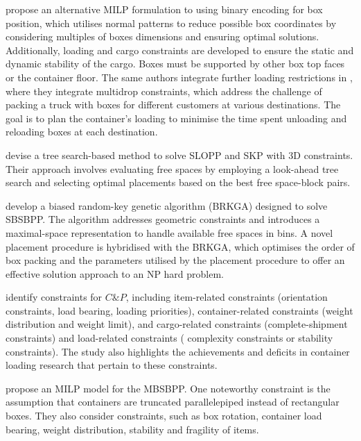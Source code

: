 \autocite{Junqueira2012Three-dimensionalConstraints} propose an alternative MILP formulation to \autocite{Chen1995EUROPEANProblem} using binary encoding for box position, which utilises normal patterns to reduce possible box coordinates by considering multiples of boxes dimensions and ensuring optimal solutions. Additionally, loading and cargo constraints are developed to ensure the static and dynamic stability of the cargo. Boxes must be supported by other box top faces or the container floor. The same authors integrate further loading restrictions in \autocite{Junqueira2012MIP-basedConstraints}, where they integrate multidrop constraints, which address the challenge of packing a
truck with boxes for different customers at various destinations. The goal is to plan the container’s loading to minimise the time spent unloading and reloading boxes at each destination.

\autocite{Zhu2012AProblem} devise a tree search-based method to solve SLOPP and SKP with 3D constraints. Their approach involves evaluating free spaces by employing a look-ahead tree search and selecting optimal placements based on the best free space-block pairs.

\autocite{Goncalves2013AProblems} develop a biased random-key genetic algorithm (BRKGA) designed to solve SBSBPP. The algorithm addresses geometric constraints and introduces a maximal-space representation to handle available free spaces in bins. A novel placement procedure is hybridised with the BRKGA, which optimises the order of box packing and the parameters utilised by the placement procedure to offer an effective solution approach to an NP hard problem.

\autocite{Bortfeldt2013ConstraintsReview} identify constraints for $C\&P$, including item-related constraints (orientation constraints,   load bearing, loading priorities), container-related constraints (weight distribution and weight limit),  and cargo-related constraints (complete-shipment constraints) and load-related constraints ( complexity constraints or stability constraints). The study also highlights the achievements and deficits in container loading research that pertain to these constraints.

\autocite{2016Paquay} propose an MILP model for the MBSBPP.  One noteworthy constraint is the assumption that containers are truncated parallelepiped instead of rectangular boxes. They also consider constraints, such as box rotation, container load bearing, weight distribution, stability and fragility of items.

